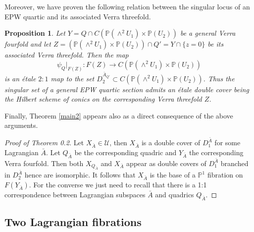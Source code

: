 \documentclass[a4paper,11pt]{amsart}
\newtheorem{prop}[thm]{Proposition}
\theoremstyle{definition}
\numberwithin{equation}{section}
\numberwithin{equation}{section} \theoremstyle{definition}
\begin{document}
Moreover, we have proven the following relation between the singular locus of an EPW quartic and its associated Verra threefold.
\begin{prop}\label{Z_Q} Let $Y=Q\cap C({{\mathbb{P}}}(\wedge^2 U_1)\times {{\mathbb{P}}}(U_2))$  be a general Verra fourfold and let $Z=({{\mathbb{P}}}(\wedge^2 U_1)\times {{\mathbb{P}}}(U_2))\cap Q' = Y\cap \{z=0\}$ be its  associated Verra threefold. Then  the map $$\psi_Q|_{F(Z)}\colon F(Z)\to C({{\mathbb{P}}}(\wedge^2 U_1)\times {{\mathbb{P}}}(U_2))$$ is an \'etale $2:1$ map to the set $D_2^{\bar{A}_{Q'}}\subset C({{\mathbb{P}}}(\wedge^2 U_1)\times {{\mathbb{P}}}(U_2))$. Thus the singular set of a general EPW quartic section admits an \'etale double cover
being the Hilbert scheme of conics on the corresponding Verra threefold $Z$.
\end{prop}

Finally, Theorem \ref{main2} appears also as a direct consequence of the above arguments.
 
 \begin{proof}[Proof of Theorem 0.2] Let $X_{\bar{A}}\in \mathcal{U}$, then $X_{\bar{A}}$ is a double cover of  $D_1^{\bar{A}}$ for some Lagrangian $\bar{A}$. Let $Q_{\bar{A}}$ be the corresponding quadric and $Y_{\bar{A}}$ the corresponding Verra fourfold. Then both $X_{Q_{\bar{A}}}$ and $X_{\bar{A}}$ appear as double covers of $D_1^{\bar{A}}$ branched in $D_2^{\bar{A}}$ hence are isomorphic. It follows that $X_{\bar{A}}$ is the base of a $\mathbb{P}^1$
fibration on $F(Y_{\bar{A}})$.  For the converse we just need to recall that there is a 1:1 correspondence between Lagrangian subspaces $\bar{A}$ and quadrics $Q_{\bar{A}}$. \end{proof}
 

 \subsection{Two Lagrangian fibrations}\label{lagr}
\end{document}
